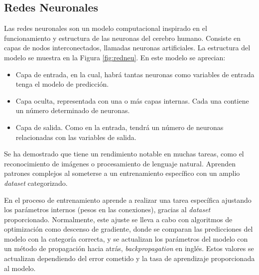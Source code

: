 	\subsection{Redes Neuronales}

		Las redes neuronales son un modelo computacional inspirado en el funcionamiento y estructura de las neuronas del cerebro humano. Consiste en capas de nodos interconectados, llamadas neuronas artificiales. La estructura del modelo se muestra en la Figura \ref{fig:redneu}. En este modelo se aprecian:


		\begin{itemize}
			\item Capa de entrada, en la cual, habrá tantas neuronas como variables de entrada tenga el modelo de predicción.
			\vspace{-0.4cm} 
			\item Capa oculta, representada con una o más capas internas. Cada una contiene un número determinado de neuronas.
			\vspace{-0.4cm}	
			\item Capa de salida. Como en la entrada, tendrá un número de neuronas relacionadas con las variables de salida.
		\end{itemize}
		
		\vspace{-0.2cm}
		
		Se ha demostrado que tiene un rendimiento notable en muchas tareas, como el reconocimiento de imágenes o procesamiento de lenguaje natural. Aprenden patrones complejos al someterse a un entrenamiento específico con un amplio \textit{dataset} categorizado.	
		
		
		En el proceso de entrenamiento aprende a realizar una tarea específica ajustando los parámetros internos (pesos en las conexiones), gracias al \textit{dataset} proporcionado. Normalmente, este ajuste se lleva a cabo con algoritmos de optimización como descenso de gradiente, donde se comparan las predicciones del modelo con la categoría correcta, y se actualizan los parámetros del modelo con un método de propagación hacia atrás, \textit{backpropagation} en inglés. Estos valores se actualizan dependiendo del error cometido y la tasa de aprendizaje proporcionada al modelo.



